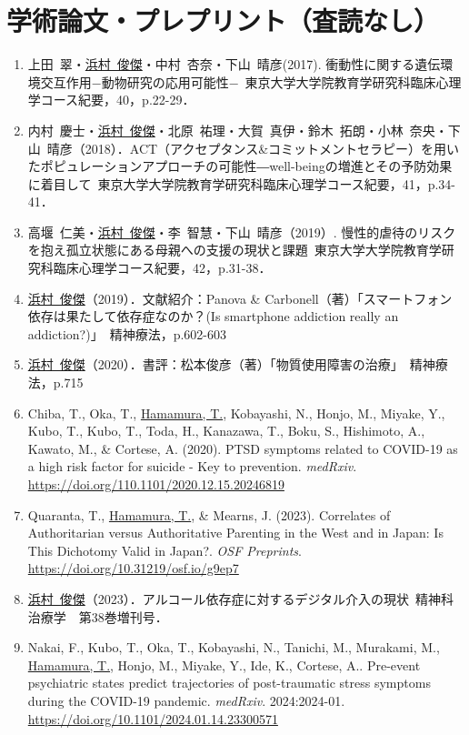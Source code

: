 \documentclass[11pt,a4paper]{article}
\begin{document}
\section{学術論文・プレプリント（査読なし）}
\begin{enumerate}
	\item 上田\ 翠・\underline{浜村\ 俊傑}・中村\ 杏奈・下山\ 晴彦(2017). 衝動性に関する遺伝環境交互作用−動物研究の応用可能性−\ 東京大学大学院教育学研究科臨床心理学コース紀要，40，p.22-29．
	\item 内村\ 慶士・\underline{浜村\ 俊傑}・北原\ 祐理・大賀\ 真伊・鈴木\ 拓朗・小林\ 奈央・下山\ 晴彦（2018）．ACT（アクセプタンス\&コミットメントセラピー）を用いたポピュレーションアプローチの可能性―well-beingの増進とその予防効果に着目して\ 東京大学大学院教育学研究科臨床心理学コース紀要，41，p.34-41．
	\item 高堰\ 仁美・\underline{浜村\ 俊傑}・李\ 智慧・下山\ 晴彦（2019）. 慢性的虐待のリスクを抱え孤立状態にある母親への支援の現状と課題\ 東京大学大学院教育学研究科臨床心理学コース紀要，42，p.31-38．
	\item \underline{浜村\ 俊傑}（2019）．文献紹介：Panova \& Carbonell（著）「スマートフォン依存は果たして依存症なのか？(Is smartphone addiction really an addiction?)」\ 精神療法，p.602-603
	\item \underline{浜村\ 俊傑}（2020）．書評：松本俊彦（著）「物質使用障害の治療」\ 精神療法，p.715
	\item Chiba, T., Oka, T., \underline{Hamamura, T.}, Kobayashi, N., Honjo, M., Miyake, Y., Kubo, T., Kubo, T., Toda, H., Kanazawa, T., Boku, S., Hishimoto, A., Kawato, M., \& Cortese, A. (2020). PTSD symptoms related to COVID-19 as a high risk factor for suicide - Key to prevention. \textit{medRxiv}. \url{https://doi.org/110.1101/2020.12.15.20246819}
	\item Quaranta, T., \underline{Hamamura, T.}, \& Mearns, J. (2023). Correlates of Authoritarian versus Authoritative Parenting in the West and in Japan: Is This Dichotomy Valid in Japan?. \textit{OSF Preprints}. \url{https://doi.org/10.31219/osf.io/g9ep7}
	\item \underline{浜村\ 俊傑}（2023）．アルコール依存症に対するデジタル介入の現状\ 精神科治療学　第38巻増刊号．
	\item Nakai, F., Kubo, T., Oka, T., Kobayashi, N., Tanichi, M., Murakami, M., \underline{Hamamura, T.}, Honjo, M., Miyake, Y., Ide, K., Cortese, A.. Pre-event psychiatric states predict trajectories of post-traumatic stress symptoms during the COVID-19 pandemic. \textit{medRxiv}. 2024:2024-01. \url{https://doi.org/10.1101/2024.01.14.23300571}

\end{enumerate}
\end{document}
